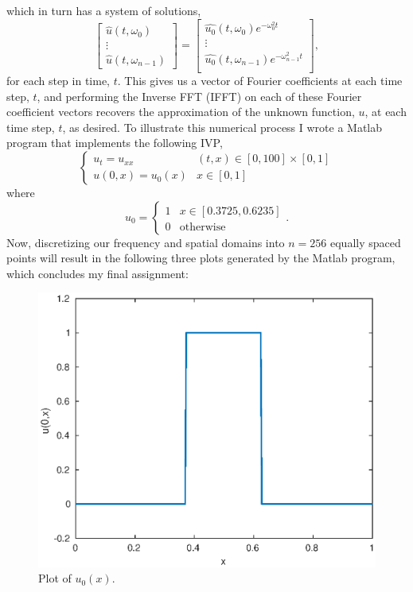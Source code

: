 \documentclass[11pt]{article}
\begin{document}
which in turn has a system of solutions,
\begin{equation*}
	\begin{bmatrix}
		\hat{u}(t,\omega_0) \\
		\vdots \\
		\hat{u}(t,\omega_{n-1})
	\end{bmatrix}
	=
	\begin{bmatrix}
		\hat{u_0}(t,\omega_0)e^{-\omega_0^2t} \\
		\vdots \\
		\hat{u_0}(t,\omega_{n-1})e^{-\omega_{n-1}^2t} \\
	\end{bmatrix},
\end{equation*}
for each step in time, $t$. This gives us a vector of Fourier coefficients at each time step, $t$, and
performing the Inverse FFT (IFFT) on each of these Fourier coefficient vectors recovers the approximation of the unknown function, $u$,
at each time step, $t$, as desired.
To illustrate this numerical process I wrote a Matlab program that implements the following IVP,
		\[
		\begin{cases}
			u_t = u_{xx} & (t,x) \in [0,100] \times [0,1] \\
			u(0,x) = u_0(x) & x \in [0,1]
		\end{cases}
		\]
where
\begin{equation*}
	u_0 =
	\begin{cases}
		1 & x \in [0.3725,0.6235] \\
		0 & \text{otherwise}
	\end{cases}.
\end{equation*}
Now, discretizing our frequency and spatial domains into $n=256$ equally spaced points
will result in the following three plots generated by the Matlab program, which concludes my final assignment:
\newpage
\begin{figure}[ht]
	\centering
	\includegraphics{u0}
	\caption{Plot of $u_0(x)$.}
\end{figure}
\end{document}
